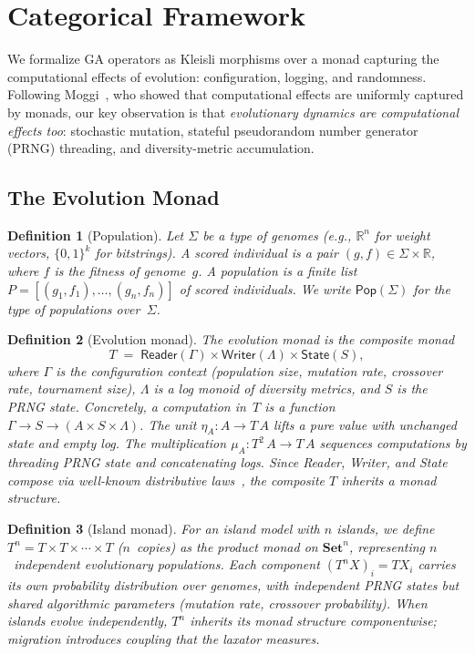 \documentclass[submission,copyright,creativecommons]{eptcs}
\newtheorem{definition}{Definition}
\begin{document}
\section{Categorical Framework}
\label{sec:framework}

We formalize GA operators as Kleisli morphisms over a monad capturing
the computational effects of evolution: configuration, logging, and
randomness. Following Moggi~\cite{moggi1991notions}, who showed that
computational effects are uniformly captured by monads, our key
observation is that \emph{evolutionary dynamics are computational
effects too}: stochastic mutation, stateful pseudorandom number generator (PRNG) threading, and
diversity-metric accumulation.

\subsection{The Evolution Monad}
\label{sec:monad}

\begin{definition}[Population]
Let $\Sigma$ be a type of \emph{genomes} (e.g., $\mathbb{R}^n$ for
weight vectors, $\{0,1\}^k$ for bitstrings). A \emph{scored individual}
is a pair $(g, f) \in \Sigma \times \mathbb{R}$, where $f$ is the
fitness of genome~$g$. A \emph{population} is a finite list
$P = [(g_1, f_1), \ldots, (g_n, f_n)]$ of scored individuals.
We write $\mathsf{Pop}(\Sigma)$ for the type of populations over~$\Sigma$.
\end{definition}

\begin{definition}[Evolution monad]
\label{def:evo-monad}
The \emph{evolution monad} is the composite monad
\[
  T \;=\; \mathsf{Reader}(\Gamma) \times \mathsf{Writer}(\Lambda) \times \mathsf{State}(S),
\]
where $\Gamma$ is the configuration context (population size,
mutation rate, crossover rate, tournament size), $\Lambda$ is a log
monoid of diversity metrics, and $S$ is the PRNG state.
Concretely, a computation in~$T$ is a function
$\Gamma \to S \to (A \times S \times \Lambda)$.
The unit $\eta_A : A \to T\,A$ lifts a pure value with unchanged
state and empty log. The multiplication
$\mu_A : T^2\,A \to T\,A$ sequences computations by threading
PRNG state and concatenating logs.
Since Reader, Writer, and State compose via well-known distributive
laws~\cite{moggi1991notions}, the composite $T$ inherits a monad
structure.
\end{definition}

\begin{definition}[Island monad]
\label{def:island-monad}
For an island model with $n$ islands, we define
$T^n = T \times T \times \cdots \times T$ ($n$~copies) as the
product monad on $\mathbf{Set}^n$, representing $n$~independent
evolutionary populations. Each component $(T^n X)_i = T\!X_i$
carries its own probability distribution over genomes, with
independent PRNG states but shared algorithmic parameters (mutation
rate, crossover probability). When islands evolve independently,
$T^n$ inherits its monad structure componentwise; migration
introduces coupling that the laxator measures.
\end{definition}
\end{document}
